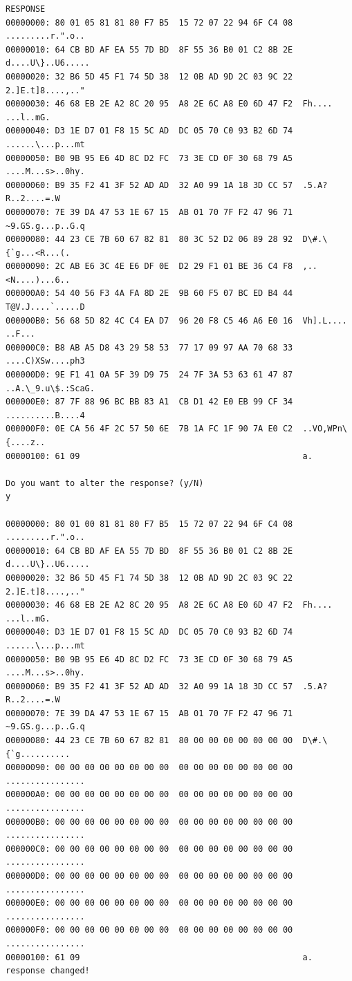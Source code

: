 \documentclass[bsc,frontabs,twoside,singlespacing,parskip,deptreport]{infthesis}     %
\begin{document}
\begin{appendices}
\begin{Verbatim}[commandchars=\\\{\}, fontsize=\small]
RESPONSE
00000000: 80 01 05 81 81 80 F7 B5  15 72 07 22 94 6F C4 08  .........r.".o..
00000010: 64 CB BD AF EA 55 7D BD  8F 55 36 B0 01 C2 8B 2E  d....U\}..U6.....
00000020: 32 B6 5D 45 F1 74 5D 38  12 0B AD 9D 2C 03 9C 22  2.]E.t]8....,.."
00000030: 46 68 EB 2E A2 8C 20 95  A8 2E 6C A8 E0 6D 47 F2  Fh.... ...l..mG.
00000040: D3 1E D7 01 F8 15 5C AD  DC 05 70 C0 93 B2 6D 74  ......\...p...mt
00000050: B0 9B 95 E6 4D 8C D2 FC  73 3E CD 0F 30 68 79 A5  ....M...s>..0hy.
00000060: B9 35 F2 41 3F 52 AD AD  32 A0 99 1A 18 3D CC 57  .5.A?R..2....=.W
00000070: 7E 39 DA 47 53 1E 67 15  AB 01 70 7F F2 47 96 71  ~9.GS.g...p..G.q
00000080: 44 23 CE 7B 60 67 82 81  80 3C 52 D2 06 89 28 92  D\#.\{`g...<R...(.
00000090: 2C AB E6 3C 4E E6 DF 0E  D2 29 F1 01 BE 36 C4 F8  ,..<N....)...6..
000000A0: 54 40 56 F3 4A FA 8D 2E  9B 60 F5 07 BC ED B4 44  T@V.J....`.....D
000000B0: 56 68 5D 82 4C C4 EA D7  96 20 F8 C5 46 A6 E0 16  Vh].L.... ..F...
000000C0: B8 AB A5 D8 43 29 58 53  77 17 09 97 AA 70 68 33  ....C)XSw....ph3
000000D0: 9E F1 41 0A 5F 39 D9 75  24 7F 3A 53 63 61 47 87  ..A.\_9.u\$.:ScaG.
000000E0: 87 7F 88 96 BC BB 83 A1  CB D1 42 E0 EB 99 CF 34  ..........B....4
000000F0: 0E CA 56 4F 2C 57 50 6E  7B 1A FC 1F 90 7A E0 C2  ..VO,WPn\{....z..
00000100: 61 09                                             a.

Do you want to alter the response? (y/N)
y

00000000: 80 01 00 81 81 80 F7 B5  15 72 07 22 94 6F C4 08  .........r.".o..
00000010: 64 CB BD AF EA 55 7D BD  8F 55 36 B0 01 C2 8B 2E  d....U\}..U6.....
00000020: 32 B6 5D 45 F1 74 5D 38  12 0B AD 9D 2C 03 9C 22  2.]E.t]8....,.."
00000030: 46 68 EB 2E A2 8C 20 95  A8 2E 6C A8 E0 6D 47 F2  Fh.... ...l..mG.
00000040: D3 1E D7 01 F8 15 5C AD  DC 05 70 C0 93 B2 6D 74  ......\...p...mt
00000050: B0 9B 95 E6 4D 8C D2 FC  73 3E CD 0F 30 68 79 A5  ....M...s>..0hy.
00000060: B9 35 F2 41 3F 52 AD AD  32 A0 99 1A 18 3D CC 57  .5.A?R..2....=.W
00000070: 7E 39 DA 47 53 1E 67 15  AB 01 70 7F F2 47 96 71  ~9.GS.g...p..G.q
00000080: 44 23 CE 7B 60 67 82 81  80 00 00 00 00 00 00 00  D\#.\{`g..........
00000090: 00 00 00 00 00 00 00 00  00 00 00 00 00 00 00 00  ................
000000A0: 00 00 00 00 00 00 00 00  00 00 00 00 00 00 00 00  ................
000000B0: 00 00 00 00 00 00 00 00  00 00 00 00 00 00 00 00  ................
000000C0: 00 00 00 00 00 00 00 00  00 00 00 00 00 00 00 00  ................
000000D0: 00 00 00 00 00 00 00 00  00 00 00 00 00 00 00 00  ................
000000E0: 00 00 00 00 00 00 00 00  00 00 00 00 00 00 00 00  ................
000000F0: 00 00 00 00 00 00 00 00  00 00 00 00 00 00 00 00  ................
00000100: 61 09                                             a.
response changed!


\end{Verbatim}
\end{appendices}
\end{document}
